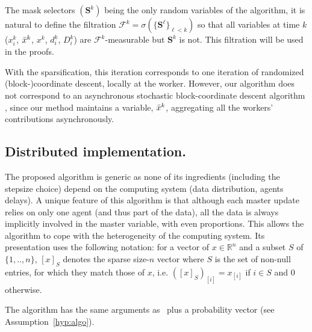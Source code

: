 The mask selectors $(\mathbf{S}^k)$ being the only random variables of the algorithm,  it is natural to define the filtration $\mathcal{F}^k = \sigma( \{\mathbf{S}^\ell\}_{\ell<k} )$ so that all variables at time $k$ ($x_i^k$, $\bar{x}^k$, $x^k$, $d_i^k$, $D_i^k$) are $\mathcal{F}^k$-measurable but $\mathbf{S}^k$ is not. This filtration will be used in the proofs.



With the sparsification, this iteration corresponds to one iteration of randomized (block-)coordinate descent, locally at the worker. However, our algorithm does not correspond to an asynchronous stochastic block-coordinate descent algorithm \cite{liu2015asynchronous,sun2017asynchronous,peng2016arock,richtarik2016distributed}, since our method maintains a variable, $\bar{x}^k$, aggregating all the workers' contributions asynchronously.



\subsection{Distributed implementation.}\label{sec:distributed-sparse-impl}


The proposed algorithm \salgo is generic as none of its ingredients (including the stepsize choice) depend on the computing system  (data distribution, agents delays). A unique feature of this algorithm is that although each master update relies on only one agent (and thus part of the data), all the data is always implicitly involved in the master variable, with even proportions. This allows the algorithm to cope with the heterogeneity of the computing system. Its presentation uses the following notation:
for a vector of $x\in\mathbb{R}^n$ and a subset $S$ of $\{1,..,n\}$, $[x]_{S}$ denotes the sparse size-$n$ vector where $S$ is the set of non-null entries, for which they match those of $x$, i.e. $([x]_{S})_{[i]} = x_{[i]}$ if $i\in S$ and $0$ otherwise.

The algorithm \salgo has the same arguments as \dave~plus a probability vector (see Assumption~\ref{hyp:algo}).

